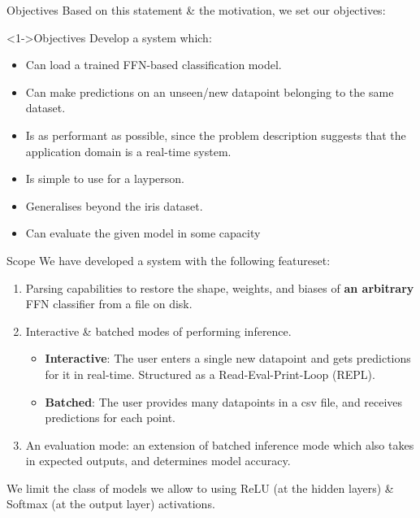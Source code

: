 \documentclass{beamer}
\begin{document}
\begin{frame}{Objectives}
  Based on this statement \& the motivation, we set our objectives:
  \begin{block}<1->{Objectives}
    Develop a system which:
    \begin{itemize}
      \item Can load a trained FFN-based classification model.
      \item Can make predictions on an unseen/new datapoint belonging to the same dataset.
      \item Is as performant as possible, since the problem description suggests that the application domain is a real-time system.
      \item Is simple to use for a layperson.
      \item Generalises beyond the iris dataset.
      \item Can evaluate the given model in some capacity
    \end{itemize}
  \end{block}
\end{frame}

\begin{frame}{Scope}
  We have developed a system with the following featureset:
  \begin{enumerate}
    \item Parsing capabilities to restore the shape, weights, and biases of \textbf{an arbitrary} FFN classifier from a file on disk.
    \item Interactive \& batched modes of performing inference. \begin{itemize}
      \item \textbf{Interactive}: The user enters a single new datapoint and gets predictions for it in real-time. Structured as a Read-Eval-Print-Loop (REPL).
      \item \textbf{Batched}: The user provides many datapoints in a csv file, and receives predictions for each point.
    \end{itemize}
    \item An evaluation mode: an extension of batched inference mode which also takes in expected outputs, and determines model accuracy.
  \end{enumerate}
  We limit the class of models we allow to using ReLU (at the hidden layers) \& Softmax (at the output layer) activations.
\end{frame}
\end{document}
